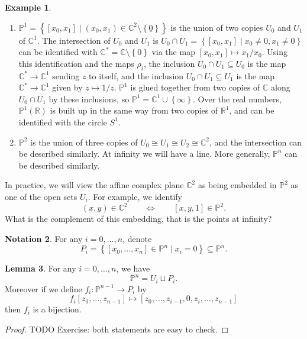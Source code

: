 \documentclass{article}
\newcommand{\R}{\mathbb{R}}
\newcommand{\C}{\mathbb{C}}
\renewcommand{\P}{\mathbb{P}}
\newcommand{\rb}[1]{\left( #1 \right)}
\renewcommand{\sb}[1]{\left[ #1 \right]}
\newcommand{\cb}[1]{\left\{ #1 \right\}}
\theoremstyle{definition}\newtheorem{definition}{Definition}[section]
\theoremstyle{definition}\newtheorem{notation}[definition]{Notation}
\theoremstyle{definition}\newtheorem{remark}[definition]{Remark}
\theoremstyle{definition}\newtheorem{example}[definition]{Example}
\theoremstyle{definition}\newtheorem{fact}{Fact}
\theoremstyle{definition}\newtheorem{exercise}{Exercise}
\newtheorem{lemma}[definition]{Lemma}
\begin{document}
\begin{example}
\hfill
\begin{enumerate}
\item $ \P^1 = \cb{\sb{x_0, x_1} \mid \rb{x_0, x_1} \in \C^2 \setminus \cb{\underline{0}}} $ is the union of two copies $ U_0 $ and $ U_1 $ of $ \C^1 $. The intersection of $ U_0 $ and $ U_1 $ is $ U_0 \cap U_1 = \cb{\sb{x_0, x_1} \mid x_0 \ne 0, x_1 \ne 0} $ can be identified with $ \C^* = \C \setminus \cb{0} $ via the map $ \sb{x_0, x_1} \mapsto x_1 / x_0 $. Using this identification and the maps $ \rho_i $, the inclusion $ U_0 \cap U_1 \subseteq U_0 $ is the map $ \C^* \to \C^1 $ sending $ z $ to itself, and the inclusion $ U_0 \cap U_1 \subseteq U_1 $ is the map $ \C^* \to \C^1 $ given by $ z \mapsto 1 / z $. $ \P^1 $ is glued together from two copies of $ \C $ along $ U_0 \cap U_1 $ by these inclusions, so $ \P^1 = \C^1 \cup \cb{\infty} $. Over the real numbers, $ \P^1\rb{\R} $ is built up in the same way from two copies of $ \R^1 $, and can be identified with the circle $ S^1 $.
\item $ \P^2 $ is the union of three copies of $ U_0 \cong U_1 \cong U_2 \cong \C^2 $, and the intersection can be described similarly. At infinity we will have a line. More generally, $ \P^n $ can be described similarly.
\end{enumerate}
\end{example}

In practice, we will view the affine complex plane $ \C^2 $ as being embedded in $ \P^2 $ as one of the open sets $ U_i $. For example, we identify
$$ \rb{x, y} \in \C^2 \qquad \iff \qquad \sb{x, y, 1} \in \P^2. $$
What is the complement of this embedding, that is the points at infinity?

\begin{notation}
For any $ i = 0, \dots, n $, denote
$$ P_i = \cb{\sb{x_0, \dots, x_n} \in \P^n \mid x_i = 0} \subseteq \P^n. $$
\end{notation}

\begin{lemma}
For any $ i = 0, \dots, n $, we have
$$ \P^n = U_i \sqcup P_i. $$
Moreover if we define $ f_i : \P^{n - 1} \to P_i $ by
$$ f_i\sb{z_0, \dots, z_{n - 1}} \mapsto \sb{z_0, \dots, z_{i - 1}, 0, z_i, \dots, z_{n - 1}} $$
then $ f_i $ is a bijection.
\end{lemma}

\begin{proof}
TODO Exercise: both statements are easy to check.
\end{proof}
\end{document}
